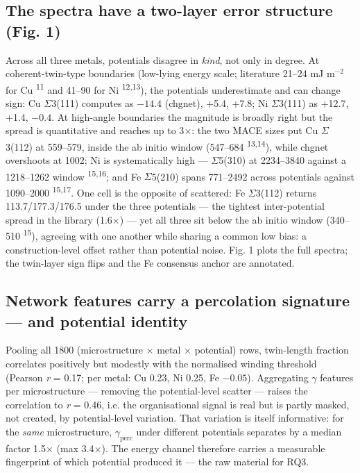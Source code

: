 \documentclass[11pt]{article}
\begin{document}
\subsection{The spectra have a two-layer error structure (Fig. 1)}

Across all three metals, potentials disagree in \textit{kind}, not only in degree. At coherent-twin-type boundaries (low-lying energy scale; literature 21--24 mJ m$^{-2}$ for Cu \textsuperscript{11} and 41--90 for Ni \textsuperscript{12,13}), the potentials underestimate and can change sign: Cu $\Sigma$3(111) computes as $-14.4$ (chgnet), +5.4, +7.8; Ni $\Sigma$3(111) as +12.7, +1.4, $-0.4$. At high-angle boundaries the magnitude is broadly right but the spread is quantitative and reaches up to 3$\times$: the two MACE sizes put Cu $\Sigma$3(112) at 559--579, inside the ab initio window (547--684 \textsuperscript{13,14}), while chgnet overshoots at 1002; Ni is systematically high --- $\Sigma$5(310) at 2234--3840 against a 1218--1262 window \textsuperscript{15,16}; and Fe $\Sigma$5(210) spans 771--2492 across potentials against 1090--2000 \textsuperscript{15,17}. One cell is the opposite of scattered: Fe $\Sigma$3(112) returns 113.7/177.3/176.5 under the three potentials --- the tightest inter-potential spread in the library (1.6$\times$) --- yet all three sit below the ab initio window (340--510 \textsuperscript{15}), agreeing with one another while sharing a common low bias: a construction-level offset rather than potential noise. Fig. 1 plots the full spectra; the twin-layer sign flips and the Fe consensus anchor are annotated.

\subsection{Network features carry a percolation signature --- and potential identity}

Pooling all 1800 (microstructure $\times$ metal $\times$ potential) rows, twin-length fraction correlates positively but modestly with the normalised winding threshold (Pearson \textit{r} = 0.17; per metal: Cu 0.23, Ni 0.25, Fe $-0.05$). Aggregating $\gamma$ features per microstructure --- removing the potential-level scatter --- raises the correlation to \textit{r} = 0.46, i.e. the organisational signal is real but is partly masked, not created, by potential-level variation. That variation is itself informative: for the \textit{same} microstructure, $\gamma_{\mathrm{perc}}$ under different potentials separates by a median factor 1.5$\times$ (max 3.4$\times$). The energy channel therefore carries a measurable fingerprint of which potential produced it --- the raw material for RQ3.
\end{document}
